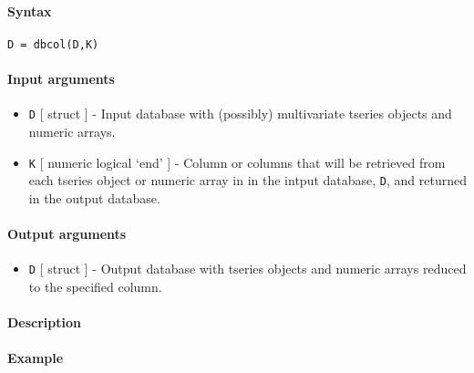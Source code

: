 


	\paragraph{Syntax}

\begin{verbatim}
D = dbcol(D,K)
\end{verbatim}

\paragraph{Input arguments}

\begin{itemize}
\item
  \texttt{D} {[} struct {]} - Input database with (possibly)
  multivariate tseries objects and numeric arrays.
\item
  \texttt{K} {[} numeric \textbar{} logical \textbar{} `end' {]} -
  Column or columns that will be retrieved from each tseries object or
  numeric array in in the intput database, \texttt{D}, and returned in
  the output database.
\end{itemize}

\paragraph{Output arguments}

\begin{itemize}
\itemsep1pt\parskip0pt
\item
  \texttt{D} {[} struct {]} - Output database with tseries objects and
  numeric arrays reduced to the specified column.
\end{itemize}

\paragraph{Description}

\paragraph{Example}


